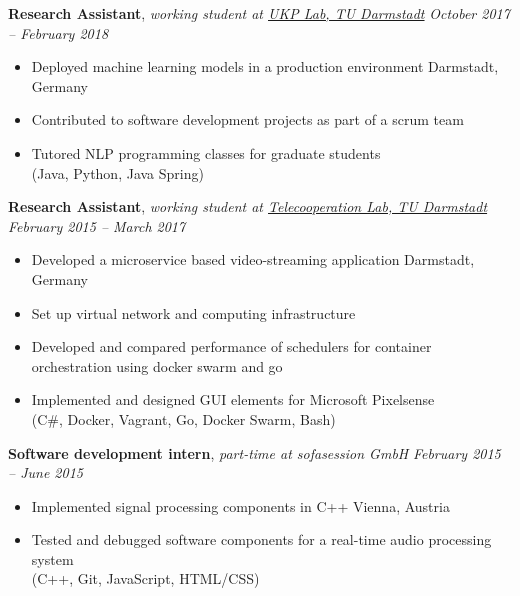 \documentclass[9pt]{extarticle}
\begin{document}
\noindent
{\bf Research Assistant}, \textit{working student at \href{https://www.informatik.tu-darmstadt.de/ukp/ukp_home/index.en.jsp}{UKP Lab, TU Darmstadt}}  \hfill \textit{October 2017 -- February 2018}
\begin{itemize}
\setlength\itemsep{0.05em}
    \item Deployed machine learning models in a production environment \hfill Darmstadt, Germany
    \item Contributed to software development projects as part of a scrum team
    \item Tutored NLP programming classes for graduate students \\
    (Java, Python, Java Spring) \\
\end{itemize}

\noindent
{\bf Research Assistant}, \textit{working student at \href{https://www.informatik.tu-darmstadt.de/telekooperation/telecooperation_group/index.en.jsp}{Telecooperation Lab, TU Darmstadt}}  \hfill \textit{February 2015 -- March 2017}
\begin{itemize}
\setlength\itemsep{0.05em}
    \item Developed a microservice based video-streaming application \hfill Darmstadt, Germany
    \item Set up virtual network and computing infrastructure 
    \item Developed and compared performance of schedulers for container orchestration using docker swarm and go
    \item Implemented and designed GUI elements for Microsoft Pixelsense \\
    (C\#, Docker, Vagrant, Go, Docker Swarm, Bash) \\
\end{itemize}


\noindent
{\bf Software development intern}, \textit{part-time at sofasession GmbH}  \hfill \textit{February 2015 -- June 2015}
\begin{itemize}
    \setlength\itemsep{0.05em}
    \item Implemented signal processing components in C++ \hfill Vienna, Austria
    \item Tested and debugged software components for a real-time audio processing system \\
    (C++, Git, JavaScript, HTML/CSS) \\
\end{itemize}
\end{document}
